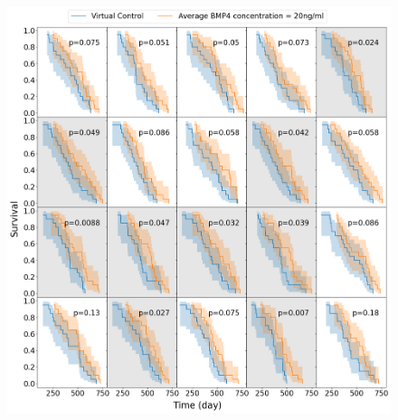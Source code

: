 \documentclass[
  default,
]{sn-jnl}
\begin{document}
\begin{figure}
\begin{minipage}{0.50\linewidth}
{\includegraphics{images/png/virtual_trial_BMP4_500_rho_case_5.png}

}

\subcaption{\label{fig-example3}}

\end{minipage}%
\newline
\begin{minipage}{0.50\linewidth}

\end{minipage}
\end{figure}
\end{document}
